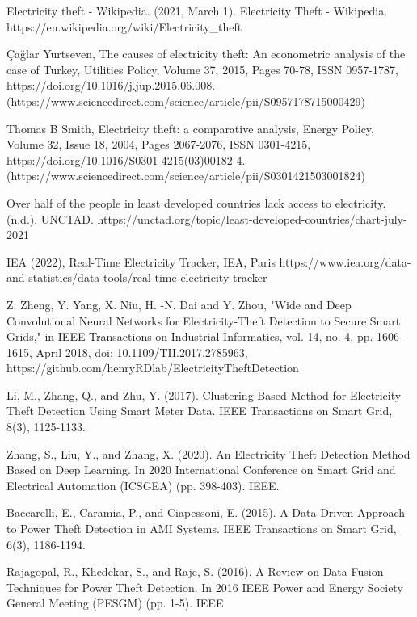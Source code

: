 \documentclass{ieeeaccess}
\begin{document}
\begin{thebibliography}{00}

 Electricity theft - Wikipedia. (2021, March 1). Electricity Theft - Wikipedia. https://en.wikipedia.org/wiki/Electricity\_theft

 Çağlar Yurtseven, The causes of electricity theft: An econometric analysis of the case of Turkey, Utilities Policy, Volume 37,
2015,
Pages 70-78,
ISSN 0957-1787,
https://doi.org/10.1016/j.jup.2015.06.008.
(https://www.sciencedirect.com/science/article/pii/S0957178715000429)

 Thomas B Smith,
Electricity theft: a comparative analysis,
Energy Policy,
Volume 32, Issue 18,
2004,
Pages 2067-2076,
ISSN 0301-4215,
https://doi.org/10.1016/S0301-4215(03)00182-4.
(https://www.sciencedirect.com/science/article/pii/S0301421503001824)

 Over half of the people in least developed countries lack access to electricity. (n.d.). UNCTAD. https://unctad.org/topic/least-developed-countries/chart-july-2021

 IEA (2022), Real-Time Electricity Tracker, IEA, Paris https://www.iea.org/data-and-statistics/data-tools/real-time-electricity-tracker

 Z. Zheng, Y. Yang, X. Niu, H. -N. Dai and Y. Zhou, "Wide and Deep Convolutional Neural Networks for Electricity-Theft Detection to Secure Smart Grids," in IEEE Transactions on Industrial Informatics, vol. 14, no. 4, pp. 1606-1615, April 2018, doi: 10.1109/TII.2017.2785963, https://github.com/henryRDlab/ElectricityTheftDetection 

 Li, M., Zhang, Q., and Zhu, Y. (2017). Clustering-Based Method for Electricity Theft Detection Using Smart Meter Data. IEEE Transactions on Smart Grid, 8(3), 1125-1133.

 Zhang, S., Liu, Y., and Zhang, X. (2020). An Electricity Theft Detection Method Based on Deep Learning. In 2020 International Conference on Smart Grid and Electrical Automation (ICSGEA) (pp. 398-403). IEEE.

 Baccarelli, E., Caramia, P., and Ciapessoni, E. (2015). A Data-Driven Approach to Power Theft Detection in AMI Systems. IEEE Transactions on Smart Grid, 6(3), 1186-1194.

 Rajagopal, R., Khedekar, S., and Raje, S. (2016). A Review on Data Fusion Techniques for Power Theft Detection. In 2016 IEEE Power and Energy Society General Meeting (PESGM) (pp. 1-5). IEEE.


\end{thebibliography}
\end{document}
